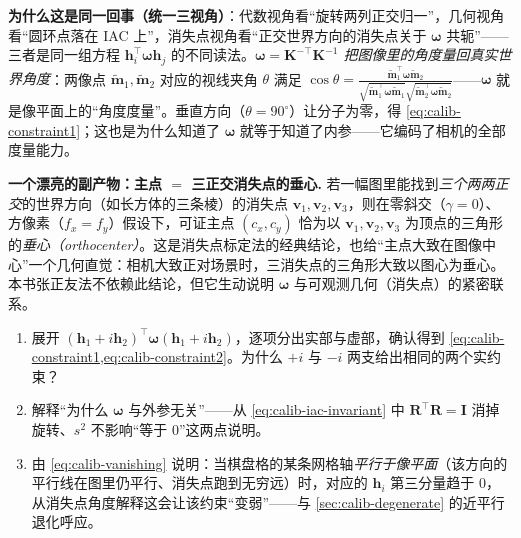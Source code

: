 \begin{insight}
\textbf{为什么这是同一回事（统一三视角）}：代数视角看“旋转两列正交归一”，几何视角看“圆环点落在 IAC 上”，消失点视角看“正交世界方向的消失点关于 $\boldsymbol{\omega}$ 共轭”——三者是同一组方程 $\mathbf{h}_i^\top\boldsymbol{\omega}\mathbf{h}_j$ 的不同读法。\emph{$\boldsymbol{\omega}=\mathbf{K}^{-\top}\mathbf{K}^{-1}$ 把图像里的角度量回真实世界角度}：两像点 $\tilde{\mathbf{m}}_1,\tilde{\mathbf{m}}_2$ 对应的视线夹角 $\theta$ 满足 $\cos\theta=\frac{\tilde{\mathbf{m}}_1^\top\boldsymbol{\omega}\tilde{\mathbf{m}}_2}{\sqrt{\tilde{\mathbf{m}}_1^\top\boldsymbol{\omega}\tilde{\mathbf{m}}_1}\sqrt{\tilde{\mathbf{m}}_2^\top\boldsymbol{\omega}\tilde{\mathbf{m}}_2}}$\cite{hartley2004multiview}——$\boldsymbol{\omega}$ 就是像平面上的“角度度量”。垂直方向（$\theta=90^\circ$）让分子为零，得 \cref{eq:calib-constraint1}；这也是为什么知道了 $\boldsymbol{\omega}$ 就等于知道了内参——它编码了相机的全部度量能力。
\end{insight}

\begin{note}
\textbf{一个漂亮的副产物：主点 $=$ 三正交消失点的垂心.}\;
若一幅图里能找到\emph{三个两两正交}的世界方向（如长方体的三条棱）的消失点 $\mathbf{v}_1,\mathbf{v}_2,\mathbf{v}_3$，则在零斜交（$\gamma=0$）、方像素（$f_x=f_y$）假设下，可证主点 $(c_x,c_y)$ 恰为以 $\mathbf{v}_1,\mathbf{v}_2,\mathbf{v}_3$ 为顶点的三角形的\emph{垂心（orthocenter）}\cite{hartley2004multiview}。这是消失点标定法的经典结论，也给“主点大致在图像中心”一个几何直觉：相机大致正对场景时，三消失点的三角形大致以图心为垂心。本书张正友法不依赖此结论，但它生动说明 $\boldsymbol{\omega}$ 与可观测几何（消失点）的紧密联系。
\end{note}

\begin{practice}[练习]
\begin{enumerate}
  \item 展开 $(\mathbf{h}_1+i\mathbf{h}_2)^\top\boldsymbol{\omega}(\mathbf{h}_1+i\mathbf{h}_2)$，逐项分出实部与虚部，确认得到 \cref{eq:calib-constraint1,eq:calib-constraint2}。为什么 $+i$ 与 $-i$ 两支给出相同的两个实约束？
  \item 解释“为什么 $\boldsymbol{\omega}$ 与外参无关”——从 \cref{eq:calib-iac-invariant} 中 $\mathbf{R}^\top\mathbf{R}=\mathbf{I}$ 消掉旋转、$s^2$ 不影响“等于 $0$”这两点说明。
  \item 由 \cref{eq:calib-vanishing} 说明：当棋盘格的某条网格轴\emph{平行于像平面}（该方向的平行线在图里仍平行、消失点跑到无穷远）时，对应的 $\mathbf{h}_i$ 第三分量趋于 $0$，从消失点角度解释这会让该约束“变弱”——与 \cref{sec:calib-degenerate} 的近平行退化呼应。
\end{enumerate}
\end{practice}

